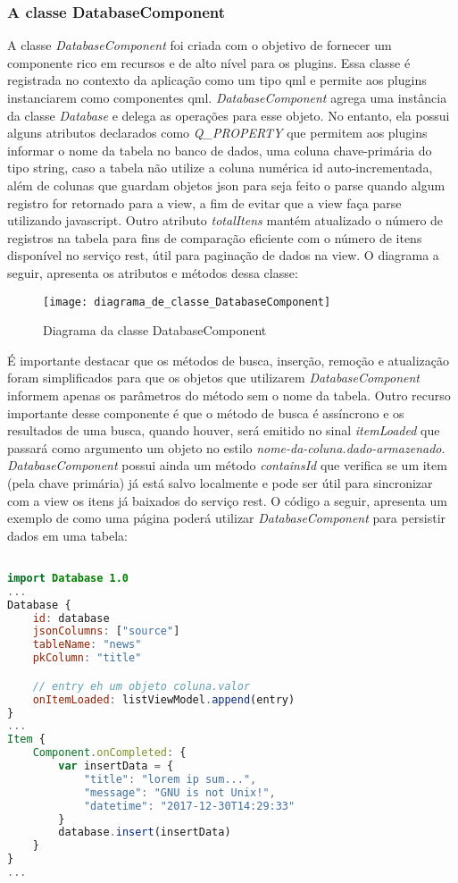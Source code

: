\subsubsection{A classe DatabaseComponent}\label{sec:solucao-desenvolvida}
A classe \textit{DatabaseComponent} foi criada com o objetivo de fornecer um componente rico em recursos e de alto nível para os plugins. Essa classe é registrada no contexto da aplicação como um tipo qml e permite aos plugins instanciarem como componentes qml. \textit{DatabaseComponent} agrega uma instância da classe \textit{Database} e delega as operações para esse objeto. No entanto, ela possui alguns atributos declarados como \textit{Q\_PROPERTY} que permitem aos plugins informar o nome da tabela no banco de dados, uma coluna chave-primária do tipo string, caso a tabela não utilize a coluna numérica id auto-incrementada, além de colunas que guardam objetos json para seja feito o parse quando algum registro for retornado para a view, a fim de evitar que a view faça parse utilizando javascript. Outro atributo \textit{totalItens} mantém atualizado o número de registros na tabela para fins de comparação eficiente com o número de itens disponível no serviço rest, útil para paginação de dados na view. O diagrama a seguir, apresenta os atributos e métodos dessa classe:

\begin{figure}[H]
	\texttt{[image: diagrama\_de\_classe\_DatabaseComponent]}
	\centering
	\caption{Diagrama da classe DatabaseComponent}
\end{figure}

É importante destacar que os métodos de busca, inserção, remoção e atualização foram simplificados para que os objetos que utilizarem \textit{DatabaseComponent} informem apenas os parâmetros do método sem o nome da tabela. Outro recurso importante desse componente é que o método de busca é assíncrono e os resultados de uma busca, quando houver, será emitido no sinal \textit{itemLoaded} que passará como argumento um objeto no estilo \textit{nome-da-coluna.dado-armazenado}. \textit{DatabaseComponent} possui ainda um método \textit{containsId} que verifica se um item (pela chave primária) já está salvo localmente e pode ser útil para sincronizar com a view os itens já baixados do serviço rest. O código a seguir, apresenta um exemplo de como uma página poderá utilizar \textit{DatabaseComponent} para persistir dados em uma tabela:

\begin{center}
\begin{lstlisting}[language=qml]

import Database 1.0
...
Database {
	id: database
	jsonColumns: ["source"]
	tableName: "news"
	pkColumn: "title"

	// entry eh um objeto coluna.valor
	onItemLoaded: listViewModel.append(entry)
}
...
Item {
	Component.onCompleted: {
		var insertData = {
			"title": "lorem ip sum...",
			"message": "GNU is not Unix!",
			"datetime": "2017-12-30T14:29:33"
		}
		database.insert(insertData)
	}
}
...
\end{lstlisting}
\end{center}


